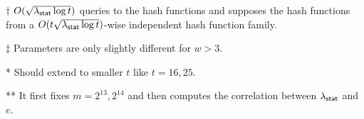 \begin{table*}
\begin{threeparttable}
\begin{tabular}{cccccc}
        \bottomrule
      \end{tabular}	
      \begin{tablenotes}
        \item [$\dag$] $O(\sqrt{\lambda_{\sf stat} \log t})$ queries to the hash functions and supposes the hash functions from a $O(t\sqrt{\lambda_{\sf stat} \log t})$-wise independent hash function family. 
        \item [$\ddag$] Parameters are only slightly different for $w>3$. 
        \item [*] Should extend to smaller $t$ like $t = 16, 25$.
        \item [**]It first fixes $m = 2^{13}, 2^{14}$ and then computes the correlation between $\lambda_{\sf stat}$ and $e$.   
        \end{tablenotes}
    \end{threeparttable}
  \end{table*}